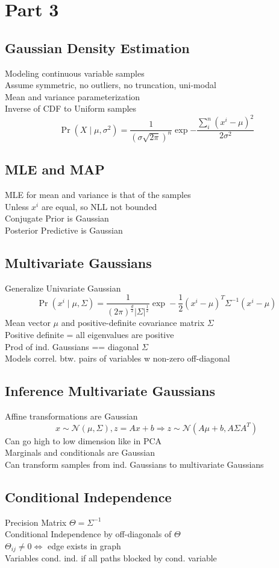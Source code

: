 \section{Part 3}
\subsection*{Gaussian Density Estimation}
Modeling continuous variable samples\\
Assume symmetric, no outliers, no truncation, uni-modal\\
Mean and variance parameterization\\
Inverse of CDF to Uniform samples
\[\Pr(X\mid\mu,\sigma^2)=\frac{1}{(\sigma\sqrt{2\pi})^n}\exp{-\frac{\sum_i^n(x^i-\mu)^2}{2\sigma^2}}\]
\subsection*{MLE and MAP}
MLE for mean and variance is that of the samples\\
Unless $x^i$ are equal, so NLL not bounded\\
Conjugate Prior is Gaussian\\
Posterior Predictive is Gaussian
\subsection*{Multivariate Gaussians}
Generalize Univariate Gaussian\\
\[\Pr(x^i\mid\mu,\Sigma)
=\frac{1}{(2\pi)^{\frac{d}{2}}|\Sigma|^{\frac{1}{2}}}
\exp-\frac{1}{2}(x^i-\mu)^T \Sigma^{-1} (x^i-\mu)\]
Mean vector $\mu$ and positive-definite covariance matrix $\Sigma$\\
Positive definite = all eigenvalues are positive\\
Prod of ind. Gaussians == diagonal $\Sigma$\\
Models correl. btw. pairs of variables w non-zero off-diagonal
\subsection*{Inference Multivariate Gaussians}
Affine transformations are Gaussian\\
\[x\sim\mathcal{N}(\mu,\Sigma), z=Ax+b \Rightarrow z\sim\mathcal{N}(A\mu+b,A\Sigma A^T)\]
Can go high to low dimension like in PCA\\
Marginals and conditionals are Gaussian\\
Can transform samples from ind. Gaussians to multivariate Gaussians
\subsection*{Conditional Independence}
Precision Matrix $\Theta=\Sigma^{-1}$\\
Conditional Independence by off-diagonals of $\Theta$\\
$\Theta_{ij}\neq 0 \Leftrightarrow$ edge exists in graph\\
Variables cond. ind. if all paths blocked by cond. variable
